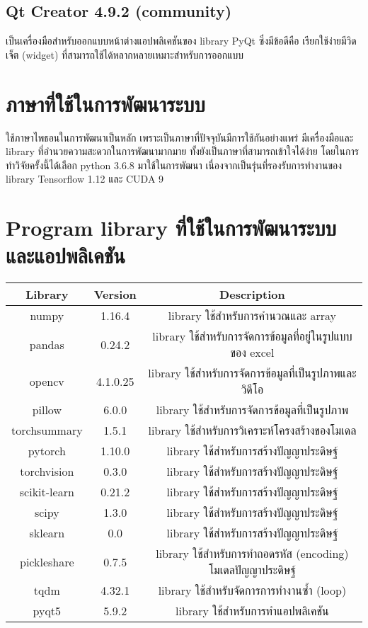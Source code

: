\subsection*{Qt Creator 4.9.2 (community)}
เป็นเครื่องมือสำหรับออกแบบหน้าต่างแอปพลิเคชันของ library PyQt ซึ่งมีข้อดีคือ เรียกใช้ง่ายมีวิดเจ็ต (widget) ที่สามารถใช้ได้หลากหลายเหมาะสำหรับการออกแบบ

\clearpage
\section{ภาษาที่ใช้ในการพัฒนาระบบ} 
	ใช้ภาษาไพธอนในการพัฒนาเป็นหลัก เพราะเป็นภาษาที่ปัจจุบันมีการใช้กันอย่างแพร่ มีเครื่องมือและ library ที่อำนวยความสะดวกในการพัฒนามากมาย 
	ทั้งยังเป็นภาษาที่สามารถเข้าใจได้ง่าย โดยในการทำวิจัยครั้งนี้ได้เลือก python 3.6.8 มาใช้ในการพัฒนา 
	เนื่องจากเป็นรุ่นที่รองรับการทำงานของ library Tensorflow 1.12 และ CUDA 9
\vspace{3mm}
\section{Program library ที่ใช้ในการพัฒนาระบบและแอปพลิเคชัน} 
\begin{tabular}{|c|c|c|}
		\hline
		{Library}&{Version}&{Description}\\
		\hline
		numpy	 			& 1.16.4		& library ใช้สำหรับการคำนวณและ array			\\
		pandas				& 0.24.2		& library ใช้สำหรับการจัดการข้อมูลที่อยู่ในรูปแบบของ excel				\\
		opencv			 	& 4.1.0.25		& library ใช้สำหรับการจัดการข้อมูลที่เป็นรูปภาพและวิดีโอ		\\
		pillow				& 6.0.0			& library ใช้สำหรับการจัดการข้อมูลที่เป็นรูปภาพ			\\
		torchsummary		& 1.5.1			& library ใช้สำหรับการวิเคราะห์โครงสร้างของโมเดล 							\\
		pytorch		 		& 1.10.0		& library ใช้สำหรับการสร้างปัญญาประดิษฐ์							\\
		torchvision			& 0.3.0	 		& library ใช้สำหรับการสร้างปัญญาประดิษฐ์							\\
		scikit-learn		& 0.21.2		& library ใช้สำหรับการสร้างปัญญาประดิษฐ์							\\
		scipy				& 1.3.0			& library ใช้สำหรับการสร้างปัญญาประดิษฐ์							\\
		sklearn				& 0.0			& library ใช้สำหรับการสร้างปัญญาประดิษฐ์							\\
		pickleshare			& 0.7.5			& library ใช้สำหรับการทำถอดรหัส (encoding) โมเดลปัญญาประดิษฐ์			\\
		tqdm				& 4.32.1		& library ใช้สำหรับจัดการการทำงานซ้ำ (loop)					\\
		pyqt5				& 5.9.2			& library ใช้สำหรับการทำแอปพลิเคชัน					\\
		\hline
\end{tabular}

